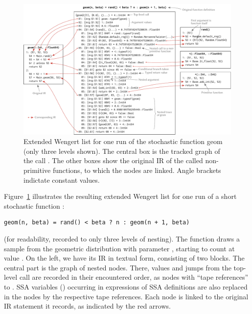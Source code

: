 \begin{figure}[t]
  \centering
  \includegraphics[width=\textwidth]{figures/wengert-list}
  \caption{Extended Wengert list for one run of the stochastic function geom (only three levels
    shown). The central box is the tracked graph of the call \protect{}. The other
    boxes show the original IR of the called non-primitive functions, to which the nodes are
    linked.  Angle brackets indictate constant values.}
  \label{fig:ext-wengert-list}
\end{figure}

Figure~\ref{fig:ext-wengert-list} illustrates the resulting extended Wengert list for one run of a
short stochastic function :
\begin{lstlisting}
geom(n, beta) = rand() < beta ? n : geom(n + 1, beta)
\end{lstlisting}
(for readability, recorded to only three levels of nesting).  The function draws a sample from the
geometric distribution with parameter , starting to count at value . On the
left, we have its IR in textual form, consisting of two blocks. The central part is the graph of
nested nodes. There, values and jumps from the top-level call are recorded in their encountered
order, as nodes with \enquote{tape references}  to . SSA variables ()
occurring in expressions of SSA definitions are also replaced in the nodes by the respective tape
references.  Each node is linked to the original IR statement it records, as indicated by the red
arrows.

